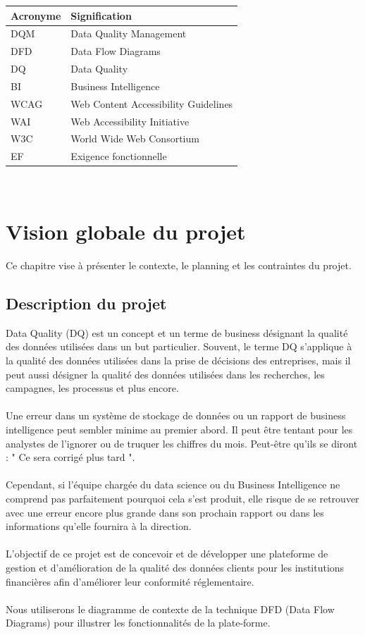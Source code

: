 \documentclass[oneside]{book}
\begin{document}
\begin{tabu} to 0.8\textwidth { | X[c] | X[c] | }
 \hline
 \textbf{Acronyme} & \textbf{Signification} \\
 \hline
 DQM  & Data Quality Management \\
\hline
DFD  & Data Flow Diagrams \\
\hline
DQ  & Data Quality \\
\hline
BI  & Business Intelligence \\
\hline
WCAG  & Web Content Accessibility Guidelines \\
\hline
WAI  & Web Accessibility Initiative \\
\hline
W3C  & World Wide Web Consortium \\
\hline
EF  & Exigence fonctionnelle \\
\hline

\end{tabu}
\\
\chapter{Vision globale du projet}
Ce chapitre vise à présenter le contexte, le planning et les contraintes du projet.
\section{Description du projet}

Data Quality (DQ) est un concept et un terme de business désignant la qualité des données utilisées dans un but particulier. Souvent, le terme DQ s'applique à la qualité des données utilisées dans la prise de décisions des entreprises, mais il peut aussi désigner la qualité des données utilisées dans les recherches, les campagnes, les processus et plus encore.
\\
\\
Une erreur dans un système de stockage de données ou un rapport de business intelligence peut sembler minime au premier abord. Il peut être tentant pour les analystes de l'ignorer ou de truquer les chiffres du mois. Peut-être qu'ils se diront : " Ce sera corrigé plus tard ".
\\
\\
Cependant, si l'équipe chargée du data science ou du Business Intelligence ne comprend pas parfaitement pourquoi cela s'est produit, elle risque de se retrouver avec une erreur encore plus grande dans son prochain rapport ou dans les informations qu'elle fournira à la direction.
\\
\\
L'objectif de ce projet est de concevoir et de développer une plateforme de gestion et d'amélioration de la qualité des données clients pour les institutions financières afin d'améliorer leur conformité réglementaire.
\\
\\
Nous utiliserons le diagramme de contexte de la technique DFD (Data Flow Diagrams) pour illustrer les fonctionnalités de la plate-forme. 
\\
\\
\end{document}
